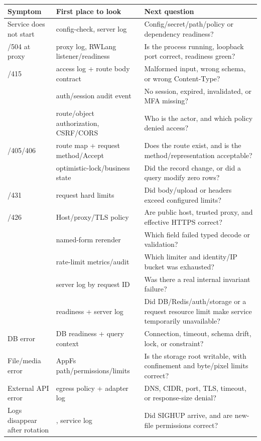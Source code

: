 \begin{longtable}{L{0.23\textwidth}L{0.30\textwidth}L{0.38\textwidth}}
\toprule
Symptom & First place to look & Next question \\
\midrule
\endhead
Service does not start & config-check, server log & Config/secret/path/policy or dependency readiness? \\
/504 at proxy & proxy log, RWLang listener/readiness & Is the process running, loopback port correct, readiness green? \\
/415 & access log + route body contract & Malformed input, wrong schema, or wrong Content-Type? \\
 & auth/session audit event & No session, expired, invalidated, or MFA missing? \\
 & route/object authorization, CSRF/CORS & Who is the actor, and which policy denied access? \\
/405/406 & route map + request method/Accept & Does the route exist, and is the method/representation acceptable? \\
 & optimistic-lock/business state & Did the record change, or did a  query modify zero rows? \\
/431 & request hard limits & Did body/upload or headers exceed configured limits? \\
/426 & Host/proxy/TLS policy & Are public host, trusted proxy, and effective HTTPS correct? \\
 & named-form rerender & Which field failed typed decode or validation? \\
 & rate-limit metrics/audit & Which limiter and identity/IP bucket was exhausted? \\
 & server log by request ID & Was there a real internal invariant failure? \\
 & readiness + server log & Did DB/Redis/auth/storage or a request resource limit make service temporarily unavailable? \\
\addlinespace
DB error & DB readiness + query context & Connection, timeout, schema drift, lock, or constraint? \\
\addlinespace
File/media error & AppFs path/permissions/limits & Is the storage root writable, with confinement and byte/pixel limits correct? \\
\addlinespace
External API error & egress policy + adapter log & DNS, CIDR, port, TLS, timeout, or response-size denial? \\
\addlinespace
Logs disappear after rotation & , service log & Did SIGHUP arrive, and are new-file permissions correct? \\
\bottomrule
\end{longtable}

